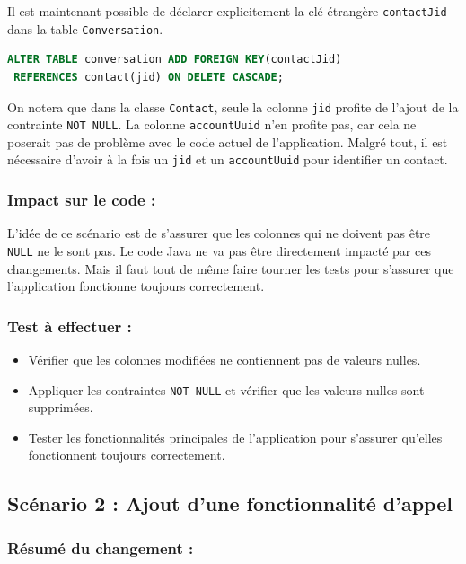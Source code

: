 \documentclass[a4paper,11pt]{article}
\begin{document}
Il est maintenant possible de déclarer explicitement la clé étrangère \texttt{contactJid} dans la table \texttt{Conversation}.

\begin{lstlisting}[language=SQL]
ALTER TABLE conversation ADD FOREIGN KEY(contactJid) 
 REFERENCES contact(jid) ON DELETE CASCADE;
\end{lstlisting}

On notera que dans la classe \texttt{Contact}, seule la colonne \texttt{jid} profite de l'ajout de la contrainte \texttt{NOT NULL}. La colonne \texttt{accountUuid} n'en profite pas, car cela ne poserait pas de problème avec le code actuel de l'application. Malgré tout, il est nécessaire d'avoir à la fois un \texttt{jid} et un \texttt{accountUuid} pour identifier un contact.

\subsubsection*{Impact sur le code :}

L'idée de ce scénario est de s'assurer que les colonnes qui ne doivent pas être \texttt{NULL} ne le sont pas. Le code Java ne va pas être directement impacté par ces changements. Mais il faut tout de même faire tourner les tests pour s'assurer que l'application fonctionne toujours correctement.

\subsubsection*{Test à effectuer :}

\begin{itemize}
	\item Vérifier que les colonnes modifiées ne contiennent pas de valeurs nulles.
	\item Appliquer les contraintes \texttt{NOT NULL} et vérifier que les valeurs nulles sont supprimées.
	\item Tester les fonctionnalités principales de l'application pour s'assurer qu'elles fonctionnent toujours correctement.
\end{itemize}

\subsection*{Scénario 2 : Ajout d'une fonctionnalité d'appel}

\subsubsection*{Résumé du changement :}
\end{document}
